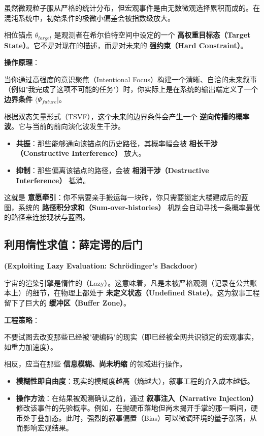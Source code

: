 虽然微观粒子服从严格的统计分布，但宏观事件是由无数微观选择累积而成的。在混沌系统中，初始条件的极微小偏差会被指数级放大。

\begin{definition}[相位锚点]
相位锚点 $\theta_{target}$ 是观测者在希尔伯特空间中设定的一个 \textbf{高权重目标态（Target State）}。它不是对现在的描述，而是对未来的 \textbf{强约束（Hard Constraint）}。
\end{definition}

\textbf{操作原理}：

当你通过高强度的意识聚焦（Intentional Focus）构建一个清晰、自洽的未来叙事（例如"我完成了这项不可能的任务"）时，你实际上是在系统的输出端定义了一个 \textbf{边界条件} $\langle \Psi_{future}|$。

根据双态矢量形式（TSVF），这个未来的边界条件会产生一个 \textbf{逆向传播的概率波}。它与当前的前向演化波发生干涉。

\begin{itemize}
\item \textbf{共振}：那些能够通向该锚点的历史路径，其概率幅会被 \textbf{相长干涉（Constructive Interference）} 放大。

\item \textbf{抑制}：那些偏离该锚点的路径，会被 \textbf{相消干涉（Destructive Interference）} 抵消。
\end{itemize}

这就是 \textbf{意愿牵引}：你不需要亲手搬运每一块砖，你只需要锁定大楼建成后的蓝图，系统的 \textbf{路径积分求和（Sum-over-histories）} 机制会自动寻找一条概率最优的路径来连接现状与蓝图。

\subsection{利用惰性求值：薛定谔的后门}

\textbf{(Exploiting Lazy Evaluation: Schrödinger's Backdoor)}

宇宙的渲染引擎是惰性的（Lazy）。这意味着，凡是未被严格观测（记录在公共账本上）的细节，在物理上都处于 \textbf{未定义状态（Undefined State）}。这为叙事工程留下了巨大的 \textbf{缓冲区（Buffer Zone）}。

\textbf{工程策略}：

不要试图去改变那些已经被"硬编码"的现实（即已经被全网共识锁定的宏观事实，如重力加速度）。

相反，应当在那些 \textbf{信息模糊、尚未坍缩} 的领域进行操作。

\begin{itemize}
\item \textbf{模糊性即自由度}：现实的模糊度越高（熵越大），叙事工程的介入成本越低。

\item \textbf{操作方法}：在结果被观测确认之前，通过 \textbf{叙事注入（Narrative Injection）} 修改该事件的先验概率。例如，在抛硬币落地但尚未揭开手掌的那一瞬间，硬币处于叠加态。此时，强烈的叙事偏置（Bias）可以微调环境的量子涨落，从而影响宏观结果。
\end{itemize}

